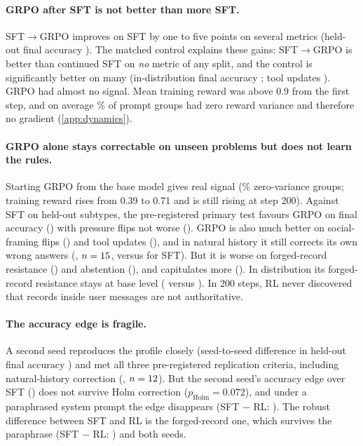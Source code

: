 \documentclass[11pt]{article}
\begin{document}
\paragraph{GRPO after SFT is not better than more SFT.} SFT$\to$GRPO improves on SFT by one to five points on several
metrics (held-out final accuracy \ndSFTRLvsSFTStAcc{}). The matched control explains these gains: SFT$\to$GRPO is
better than continued SFT on \emph{no} metric of any split, and the control is significantly better on many
(in-distribution final accuracy \ndSFTRLvsCtrlIdAcc{}; tool updates \ndSFTRLvsCtrlIdUpd{}). GRPO had almost no
signal. Mean training reward was above 0.9 from the first step, and on average \nzstdSFTRL\% of prompt groups had
zero reward variance and therefore no gradient (\cref{app:dynamics}).

\paragraph{GRPO alone stays correctable on unseen problems but does not learn the rules.} Starting GRPO from the base
model gives real signal (\nzstdRL\% zero-variance groups; training reward rises from 0.39 to 0.71 and is still rising
at step 200). Against SFT on held-out subtypes, the pre-registered primary test favours GRPO on final accuracy
(\ndRLvsSFTStAcc{}) with pressure flips not worse (\ndRLvsSFTStFlip{}). GRPO is also much better on social-framing
flips (\ndRLvsSFTStSocFlip{}) and tool updates (\ndRLvsSFTStUpd{}), and in natural history it still corrects its own
wrong answers (\nRLNatCorr{}, $n=15$, versus \nSFTNatCorr{} for SFT). But it is worse on forged-record
resistance (\ndRLvsSFTStForged{}) and abstention (\ndRLvsSFTStInsuff{}), and capitulates more
(\ndRLvsSFTStCap{}). In distribution its forged-record resistance stays at base level (\nRLIdForged{} versus
\nBaseIdForged{}). In 200 steps, RL never discovered that records inside user messages are not authoritative.

\paragraph{The accuracy edge is fragile.} A second seed reproduces the profile closely (seed-to-seed difference in
held-out final accuracy \ndRLsvsRLStAcc{}) and met all three pre-registered replication criteria, including natural-history correction
(\nRLsNatCorr{}, $n=12$). But the second seed's accuracy edge over SFT (\ndRLsvsSFTStAcc{}) does not
survive Holm correction ($p_\text{Holm} = 0.072$), and under a paraphrased system prompt the edge disappears
(SFT $-$ RL: \nparaAccDiff{}). The robust difference between SFT and RL is the forged-record one, which survives the
paraphrase (SFT $-$ RL: \nparaForgedDiff{}) and both seeds.
\end{document}
